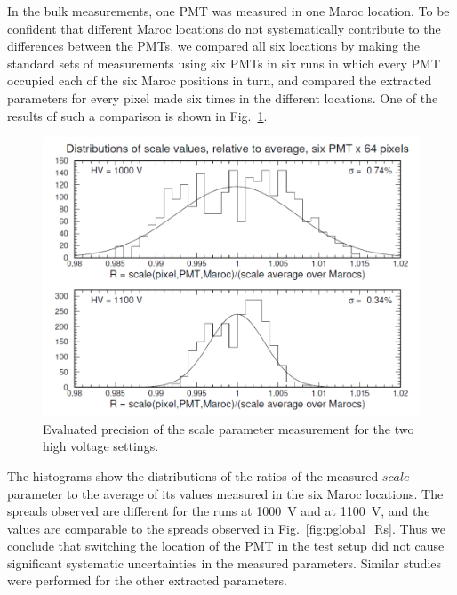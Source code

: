 In the bulk measurements, one PMT was measured in one Maroc location. To be confident that different Maroc locations do not systematically contribute to the differences between the PMTs, we compared all six locations by making the standard sets of measurements using six PMTs in six runs in which every PMT occupied each of the six Maroc positions in turn, and compared the extracted parameters for every pixel made six times in the different locations. One of the results of such a comparison is shown in Fig.~\ref{fig:R_scale_maroc_avg}. 
\begin{figure}[h!]
	\centering
	\includegraphics[width=0.98\linewidth, trim=0 10 15 10, clip]{figures/R_scale_maroc_avg.png}
	\caption{Evaluated precision of the scale parameter measurement for the two high voltage settings.}
	\label{fig:R_scale_maroc_avg}
\end{figure}
The histograms show the distributions of the ratios of the measured $scale$ parameter to the average of its values measured in the six Maroc locations. The spreads observed are different for the runs at 1000~V and at 1100~V, and the values are comparable to the spreads observed in Fig.~\ref{fig:pglobal_Rs}. Thus we conclude that switching the location of the PMT in the test setup did not cause significant systematic uncertainties in the measured parameters. Similar studies were performed for the other extracted parameters.


